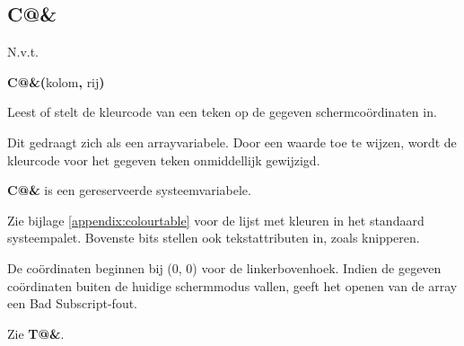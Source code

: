 
\newpage
\subsection{C@\&}
\begin{description}[leftmargin=2cm,style=nextline]
\item [Token:]   N.v.t.

\item [Formaat:]  {\bf C@\&(}kolom{\bf ,} rij{\bf)}

\item [Gebruik:]   Leest of stelt de kleurcode van een teken op de gegeven schermcoördinaten in.

                 Dit gedraagt zich als een arrayvariabele. Door een waarde toe te wijzen, wordt de kleurcode voor het gegeven teken onmiddellijk gewijzigd.

\item[Opmerkingen:]  {\bf C@\&} is een gereserveerde systeemvariabele.

                 Zie bijlage \vref{appendix:colourtable} voor de lijst met kleuren in het standaard systeempalet. Bovenste bits stellen ook tekstattributen in, zoals knipperen.

                 De coördinaten beginnen bij (0, 0) voor de linkerbovenhoek. Indien de gegeven coördinaten buiten de huidige schermmodus vallen, geeft het openen van de array een Bad Subscript-fout.

\item [Voorbeeld:]  Zie {\bf T@\&}.
\end{description}


\newpage
